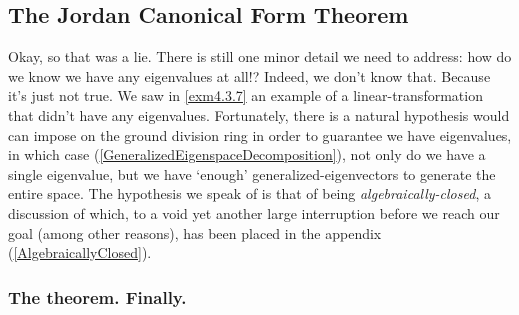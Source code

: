 \subsection{The Jordan Canonical Form Theorem}

Okay, so that was a lie.  There is still one minor detail we need to address:  how do we know we have any eigenvalues at all!?  Indeed, we don't know that.  Because it's just not true.  We saw in \cref{exm4.3.7} an example of a linear-transformation that didn't have any eigenvalues.  Fortunately, there is a natural hypothesis would can impose on the ground division ring in order to guarantee we have eigenvalues, in which case (\cref{GeneralizedEigenspaceDecomposition}), not only do we have a single eigenvalue, but we have `enough' generalized-eigenvectors to generate the entire space.  The hypothesis we speak of is that of being \emph{algebraically-closed}, a discussion of which, to a void yet another large interruption before we reach our goal (among other reasons), has been placed in the appendix (\cref{AlgebraicallyClosed}).

\subsubsection{The theorem.  Finally.}

